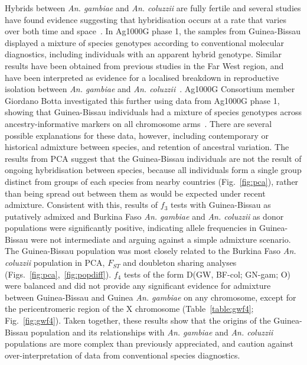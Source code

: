 \begin{refsection}
Hybrids between \textit{An. gambiae} and \textit{An. coluzzii} are fully fertile and several studies have found evidence suggesting that hybridisation occurs at a rate that varies over both time and space~\parencite{Lee2013,Weetman2012}.
%
In Ag1000G phase 1, the samples from Guinea-Bissau displayed a mixture of species genotypes according to conventional molecular diagnostics, including individuals with an apparent hybrid genotype.
%
Similar results have been obtained from previous studies in the Far West region, and have been interpreted as evidence for a localised breakdown in reproductive isolation between \textit{An. gambiae} and \textit{An. coluzzii}~\parencite{Oliveira2008,Marsden2011,Weetman2012,Gordicho2014,Vicente2017}.
%
Ag1000G Consortium member Giordano Botta investigated this further using data from Ag1000G phase 1, showing that Guinea-Bissau individuals had a mixture of species genotypes across ancestry-informative markers on all chromosome arms~\parencite{Ag1000G2017}.
%
There are several possible explanations for these data, however, including contemporary or historical admixture between species, and retention of ancestral variation.
%
The results from PCA suggest that the Guinea-Bissau individuals are not the result of ongoing hybridisation between species, because all individuals form a single group distinct from groups of each species from nearby countries (Fig.~\ref{fig:pca}), rather than being spread out between them as would be expected under recent admixture.
%
Consistent with this, results of $f_3$ tests with Guinea-Bissau as putatively admixed and Burkina Faso \textit{An. gambiae} and \textit{An. coluzzii} as donor populations were significantly positive, indicating allele frequencies in Guinea-Bissau were not intermediate and arguing against a simple admixture scenario.
%
The Guinea-Bissau population was most closely related to the Burkina Faso \textit{An. coluzzii} population in PCA, $F_{ST}$ and doubleton sharing analyses (Figs.~\ref{fig:pca},~\ref{fig:popdiff}).
%
$f_4$ tests of the form D(GW, BF-col; GN-gam; O) were balanced and did not provide any significant evidence for admixture between Guinea-Bissau and Guinea \textit{An. gambiae} on any chromosome, except for the pericentromeric region of the X chromosome (Table~\ref{table:gwf4}; Fig.~\ref{fig:gwf4}).
%
Taken together, these results show that the origins of the Guinea-Bissau population and its relationships with \textit{An. gambiae} and \textit{An. coluzzii} populations are more complex than previously appreciated, and caution against over-interpretation of data from conventional species diagnostics.



\end{refsection}
